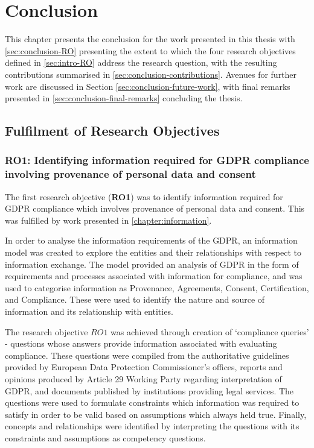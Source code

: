 \chapter{Conclusion}
This chapter presents the conclusion for the work presented in this thesis with \autoref{sec:conclusion-RO} presenting the extent to which the four research objectives defined in \autoref{sec:intro-RO} address the research question, with the resulting contributions summarised in \autoref{sec:conclusion-contributions}. Avenues for further work are discussed in Section \autoref{sec:conclusion-future-work}, with final remarks presented in \autoref{sec:conclusion-final-remarks} concluding the thesis.

\section{Fulfilment of Research Objectives}\label{sec:conclusion-RO}
\subsection*{RO1: Identifying information required for GDPR compliance involving provenance of personal data and consent}
The first research objective (\textbf{RO1}) was to identify information required for GDPR compliance which involves provenance of personal data and consent. This was fulfilled by work presented in \autoref{chapter:information}.

In order to analyse the information requirements of the GDPR, an information model was created to explore the entities and their relationships with respect to information exchange. The model provided an analysis of GDPR  in the form of requirements and processes associated with information for compliance, and was used to categorise information as Provenance, Agreements, Consent, Certification, and Compliance. These were used to identify the nature and source of information and its relationship with entities.

The research objective $RO1$ was achieved through creation of `compliance queries' - questions whose answers provide information associated with evaluating compliance. These questions were compiled from the authoritative guidelines provided by European Data Protection Commissioner's offices, reports and opinions produced by Article 29 Working Party regarding interpretation of GDPR, and documents published by institutions providing legal services. The questions were used to formulate constraints which information was required to satisfy in order to be valid based on assumptions which always held true. Finally, concepts and relationships were identified by interpreting the questions with its constraints and assumptions as competency questions.

